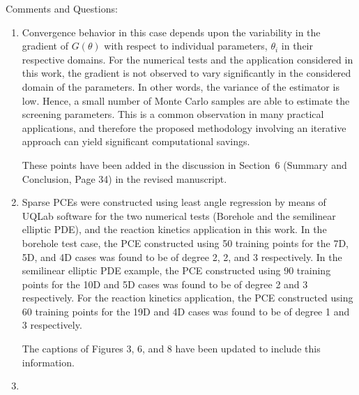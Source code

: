 \documentclass[11pt,final]{article}
\newcommand{\referee}[1]{\vspace{.1ex}\noindent{\textcolor{blue}{#1}}}
\begin{document}
Comments and Questions:
\begin{enumerate}

\item \referee{P16, Figure.2,  the estimated screening parameters eq (5) based on eq(1)
quickly converge with a small number of samples (5-10 samples). It seems that
if $\mu_i$ is based on eq(1), it will still require a reasonable amount of
samples, can authors comment on why this example converges with a small number
of samples? The same question applies to Figure 5 and Figure 7.}

Convergence behavior in this case depends upon the variability in the gradient of
$G(\theta)$ with respect to individual parameters, $\theta_i$ in their respective
domains. For the numerical tests and the application considered in this work, the
gradient is not observed to vary significantly in the considered domain of the
parameters. In other words, the variance of the estimator is low. 
Hence, a small number of Monte Carlo samples are able to estimate
the screening parameters. This is a common observation in many practical
applications, and therefore the proposed methodology involving an iterative
approach can yield significant computational savings. 

These points have been added in the discussion in Section~6 (Summary and
Conclusion, Page 34) in the revised manuscript. 

\item 
\referee{P17, Figure 3, what's the degree of the PCE used in the example? The same
question applies to Figure 6 and Figure 8.}

Sparse PCEs were constructed using least angle regression by means of UQLab software
for the two numerical tests (Borehole and the semilinear elliptic PDE),
and the reaction kinetics application in this work.  
In the borehole test case, the PCE constructed using 50 training points for the 7D, 5D, and
4D cases was found to be of degree 2, 2, and 3 respectively.  
In the semilinear elliptic PDE example, the PCE constructed using 90 training
points for the 10D and 5D cases was found to be of degree 2 and 3 respectively.
For the reaction kinetics application, the PCE constructed using 60 training points
for the 19D and 4D cases was found to be of degree 1 and 3 respectively. 

The captions of Figures 3, 6, and 8 have been updated to include this information. 

\item
\referee{
P25, Figure 7, it seems that the rank of the parameters and the difference of
$\mu_s$ doesn't change too much over iterations. Does it indicate the initial
parameter screening  (line 1-6 in Algorithm 1) is good enough for ranking the
parameters? Can the authors plot the similar figure for other examples to see
if the iterative screening procedure does make a difference on the ranking the
parameters compared with the initial parameter screening step?}


\end{enumerate}
\end{document}
